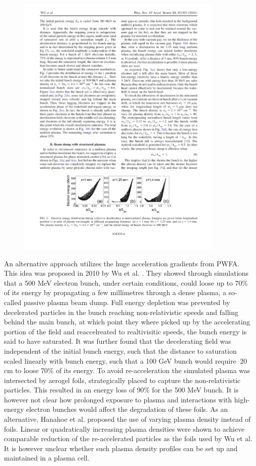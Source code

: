 \begin{figure}
\centering
\includegraphics[width=0.9\textwidth]{Wu_energy_uniform.pdf}
\caption{}
\label{Wu}
\end{figure}
\indent An alternative approach utilizes the huge acceleration gradients from PWFA. This idea was proposed in 2010 by Wu et al. \cite{Wu2010}. They showed through simulations that a 500 MeV electron bunch, under certain conditions, could loose up to 70\% of its energy by propagating a few millimetres through a dense plasma, a so-called passive plasma beam dump. Full energy depletion was prevented by decelerated particles in the bunch reaching non-relativistic speeds and falling behind the main bunch, at which point they where picked up by the accelerating portion of the field and reaccelreated to realtivisitic speeds, the bunch energy is said to have saturated. It was further found that the decelerating field was independent of the initial bunch energy, such that the distance to saturation scaled linearly with bunch energy, such that a 100 GeV bunch would require $~20$ cm to loose 70\% of its energy. To avoid re-acceleration the simulated plasma was intersected by aerogel foils, strategically placed to capture the non-relativistic particles. This resulted in an energy loss of 90\% for the 500 MeV bunch. It is however not clear how prolonged exposure to plasma and interactions with high-energy electron bunches would affect the degradation of these foils. As an alternative, Hanahoe et al. \cite{Hanahoe2017} proposed the use of varying plasma density instead of foils. Linear or quadratically increasing plasma densities were shown to achieve comparable reduction of the re-accelerated particles as the foils used by Wu et al.  It is however unclear whether such plasma density profiles can be set up and maintained in a plasma cell. 
